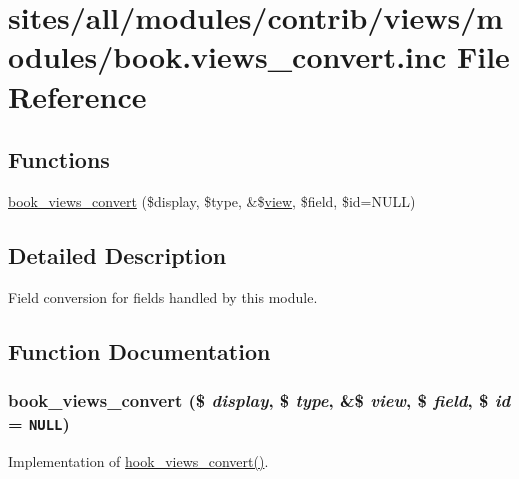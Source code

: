 \hypertarget{book_8views__convert_8inc}{
\section{sites/all/modules/contrib/views/modules/book.views\_\-convert.inc File Reference}
\label{book_8views__convert_8inc}
}
\subsection*{Functions}
\begin{CompactItemize}
\item 
\hyperlink{book_8views__convert_8inc_3349ee5a253e58168b8233952a8f5dba}{book\_\-views\_\-convert} (\$display, \$type, \&\$\hyperlink{classview}{view}, \$field, \$id=NULL)
\end{CompactItemize}


\subsection{Detailed Description}
Field conversion for fields handled by this module. 

\subsection{Function Documentation}
\hypertarget{book_8views__convert_8inc_3349ee5a253e58168b8233952a8f5dba}{
\subsubsection[{book\_\-views\_\-convert}]{\setlength{\rightskip}{0pt plus 5cm}book\_\-views\_\-convert (\$ {\em display}, \/  \$ {\em type}, \/  \&\$ {\em view}, \/  \$ {\em field}, \/  \$ {\em id} = {\tt NULL})}}
\label{book_8views__convert_8inc_3349ee5a253e58168b8233952a8f5dba}


Implementation of \hyperlink{group__views__hooks_ge98b0a1c700fe1406af390dfc8c7262e}{hook\_\-views\_\-convert()}. 